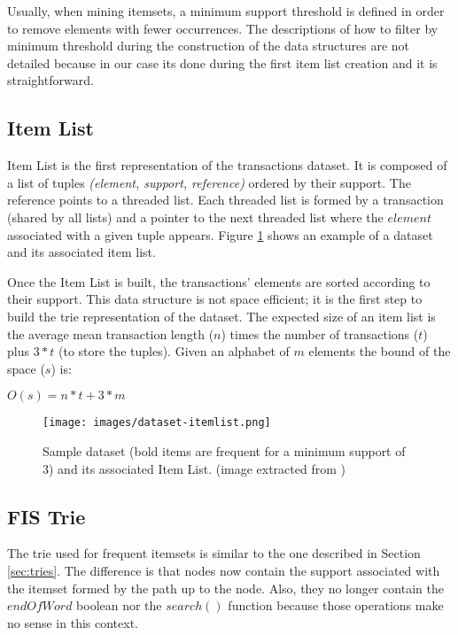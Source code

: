 \documentclass[a4paper,10pt,table,xcdraw]{article}
\begin{document}
Usually, when mining itemsets, a minimum support threshold is defined in order to remove elements with fewer occurrences. The descriptions of how to filter by minimum threshold during the construction of the data structures are not detailed because in our case its done during the first item list creation and it is straightforward.



\subsection{Item List}

Item List is the first representation of the transactions dataset. It is composed of a list of tuples \textit{(element, support, reference)} ordered by their support. The reference points to a threaded list. Each threaded list is formed by a transaction (shared by all lists) and a pointer to the next threaded list where the $element$ associated with a given tuple appears. Figure \ref{fig:dataset} shows an example of a dataset and its associated item list.

Once the Item List is built, the transactions' elements are sorted according to their support. This data structure is not space efficient; it is the first step to build the trie representation of the dataset. The expected size of an item list is the average mean transaction length ($n$) times the number of transactions ($t$) plus $3*t$ (to store the tuples). Given an alphabet of $m$ elements the bound of the space ($s$) is:

$O(s) = n * t + 3 * m$

\begin{figure}[h]
\centering
\texttt{[image: images/dataset-itemlist.png]}
\caption{Sample dataset (bold items are frequent for a minimum support of 3) and its associated Item List. (image extracted from \cite{Pietracaprina2003})  }
\label{fig:dataset}
\end{figure}



\subsection{FIS Trie}



The trie used for frequent itemsets is similar to the one described in Section \ref{sec:tries}. The difference is that nodes now contain the support associated with the itemset formed by the path up to the node. Also, they no longer contain the $endOfWord$ boolean nor the $search()$ function because those operations make no sense in this context. 
\end{document}
